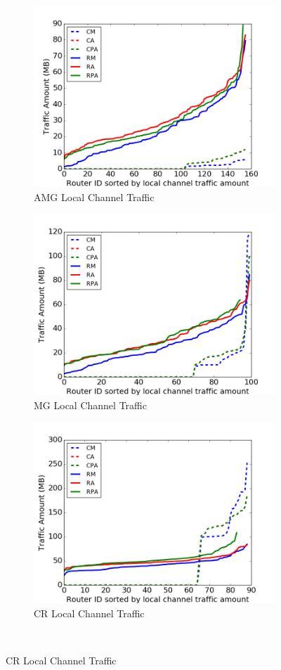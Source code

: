\documentclass[conference,compsoc]{IEEEtran}
\begin{document}
\begin{figure}[t]
    \centering
    \begin{subfigure}[t]{0.32\textwidth}
        \centering
        \includegraphics[height=1.8 in]{amg/lc-traffic}
        \caption{AMG Local Channel Traffic}
        \label{fig:amg-lc-traffic}
    \end{subfigure}\hfill
    \hspace{1em}%
    \begin{subfigure}[t]{0.32\textwidth}
        \centering
        \includegraphics[height=1.8 in]{mg/lc-traffic}
        \caption{MG Local Channel Traffic}
        \label{fig:mg-lc-traffic}
    \end{subfigure}\hfill
    \begin{subfigure}[t]{0.32\textwidth}
        \centering
        \includegraphics[height=1.8 in]{cr/lc-traffic}
        \caption{CR Local Channel Traffic}
        \label{fig:cr-lc-traffic}
    \end{subfigure}\\


\end{figure}
\end{document}
